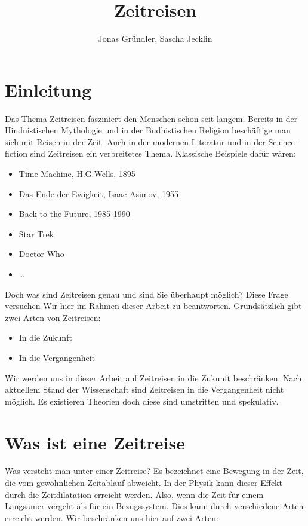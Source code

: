 \documentclass[]{article}
\title{Zeitreisen}
\author{Jonas Gr\"undler, Sascha Jecklin}
\begin{document}
\maketitle



\section{Einleitung}
	 Das Thema Zeitreisen fasziniert den Menschen schon seit langem. Bereits in der Hinduistischen Mythologie und in der Budhistischen Religion besch\"aftige man sich mit Reisen in der Zeit. Auch in der modernen Literatur und in der Science-fiction sind Zeitreisen ein verbreitetes Thema. Klassische Beispiele daf\"ur w\"aren: 
	 
	 \begin{itemize}
	 	\item Time Machine, H.G.Wells, 1895 
	 	\item Das Ende der Ewigkeit, Isaac Asimov, 1955
	 	\item Back to the Future, 1985-1990
	 	\item Star Trek
	 	\item Doctor Who
	 	\item \ldots
	 \end{itemize}
 
	 Doch was sind Zeitreisen genau und sind Sie \"uberhaupt m\"oglich? Diese Frage versuchen Wir hier im Rahmen dieser Arbeit zu beantworten.
	 Grunds\"atzlich gibt zwei Arten von Zeitreisen:
	
	\begin{itemize}
		\item In die Zukunft
		\item In die Vergangenheit
	\end{itemize}
	
	Wir werden uns in dieser Arbeit auf Zeitreisen in die Zukunft beschr\"anken. Nach aktuellem Stand der Wissenschaft sind Zeitreisen in die Vergangenheit nicht m\"oglich. Es existieren Theorien doch diese sind umstritten und spekulativ.
	
\section{Was ist eine Zeitreise}
	Was versteht man unter einer Zeitreise? Es bezeichnet eine Bewegung in der Zeit, die vom gew\"ohnlichen Zeitablauf abweicht. In der Physik kann dieser Effekt durch die Zeitdilatation erreicht werden. Also, wenn die Zeit f\"ur einem Langsamer vergeht als f\"ur ein Bezugssystem. Dies kann durch verschiedene Arten erreicht werden. Wir beschr\"anken uns hier auf zwei Arten:
	
\end{document}

